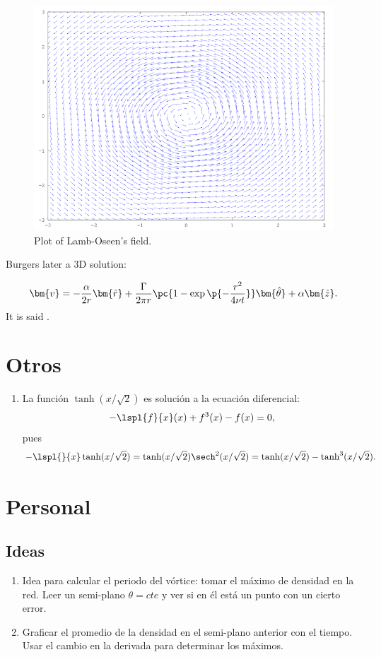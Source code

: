 \documentclass[10pt,letterpaper]{article}
\begin{document}
\begin{figure}[h]
\centering
\includegraphics[scale=1]{img/vortex.png}
\caption{Plot of Lamb-Oseen's field.}
\end{figure}

Burgers later a 3D solution:

\begin{equation}
\bm{v} = -\frac{\alpha}{2r}\bm{\hat{r}} + \frac{\Gamma}{2\pi r}\pc{1-\exp\p{-\frac{r^2}{4\nu t}}}\bm{\hat{\theta}} + \alpha\bm{\hat{z}}. 
\end{equation}
It is said \cite{analyticalVSolutions}.

\section{Otros}
\begin{enumerate}
\item La función $\tanh(x/\sqrt{2})$ es solución a la ecuación diferencial:
\begin{equation}
-\lspl{f}{x}(x) + f^3(x) - f(x) = 0,
\end{equation}
pues
\begin{equation*}
-\lspl{}{x}\tanh(x/\sqrt{2}) = \tanh(x/\sqrt{2})\sech^2(x/\sqrt{2}) = \tanh(x/\sqrt{2}) - \tanh^3(x/\sqrt{2}).
\end{equation*}
\end{enumerate}

\section{Personal}
\subsection{Ideas}
\begin{enumerate}
\item Idea para calcular el periodo del vórtice: tomar el máximo de densidad en la red. Leer un semi-plano $\theta = cte$ y ver si en él está un punto con un cierto error.
\item Graficar el promedio de la densidad en el semi-plano anterior con el tiempo. Usar el cambio en la derivada para determinar los máximos.
\end{enumerate}
\end{document}
